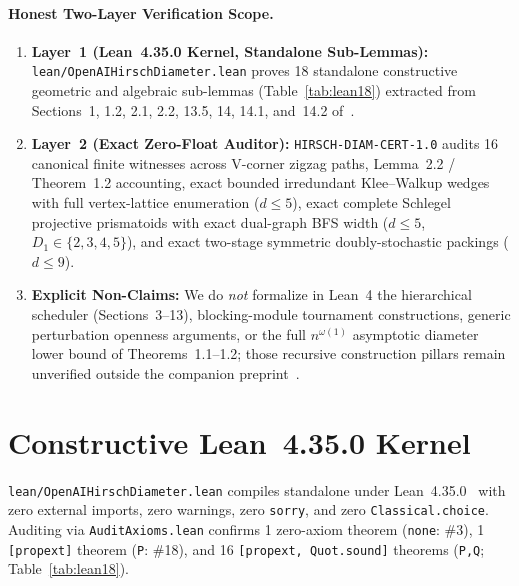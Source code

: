 \documentclass[10pt,twocolumn]{article}
\begin{document}
\paragraph{Honest Two-Layer Verification Scope.}
\begin{enumerate}[leftmargin=1.2em,itemsep=1pt,topsep=2pt]
  \item \textbf{Layer~1 (Lean~4.35.0 Kernel, Standalone Sub-Lemmas):} \texttt{lean/OpenAI\allowbreak HirschDiameter.lean} proves 18 standalone constructive geometric and algebraic sub-lemmas (Table~\ref{tab:lean18}) extracted from Sections~1, 1.2, 2.1, 2.2, 13.5, 14, 14.1, and~14.2 of~\cite{openai2026hirsch}.
  \item \textbf{Layer~2 (Exact Zero-Float Auditor):} \texttt{HIRSCH-\allowbreak DIAM-\allowbreak CERT-1.0} audits 16 canonical finite witnesses across V-corner zigzag paths, Lemma~2.2 / Theorem~1.2 accounting, exact bounded irredundant Klee--Walkup wedges with full vertex-lattice enumeration ($d\le 5$), exact complete Schlegel projective prismatoids with exact dual-graph BFS width ($d\le 5$, $D_1\in\{2,3,4,5\}$), and exact two-stage symmetric doubly-stochastic packings ($d\le 9$).
  \item \textbf{Explicit Non-Claims:} We do \emph{not} formalize in Lean~4 the hierarchical scheduler (Sections~3--13), blocking-module tournament constructions, generic perturbation openness arguments, or the full $n^{\omega(1)}$ asymptotic diameter lower bound of Theorems~1.1--1.2; those recursive construction pillars remain unverified outside the companion preprint~\cite{openai2026hirsch}.
\end{enumerate}

\section{Constructive Lean~4.35.0 Kernel}\label{sec:lean}
\texttt{lean/OpenAI\allowbreak HirschDiameter.lean} compiles standalone under Lean~4.35.0~\cite{demoura2021lean4} with zero external imports, zero warnings, zero \texttt{sorry}, and zero \texttt{Classical.choice}. Auditing via \texttt{AuditAxioms.lean} confirms 1 zero-axiom theorem (\texttt{none}: \#3), 1 \texttt{[propext]} theorem (\texttt{P}: \#18), and 16 \texttt{[propext, Quot.sound]} theorems (\texttt{P,Q}; Table~\ref{tab:lean18}).
\end{document}

